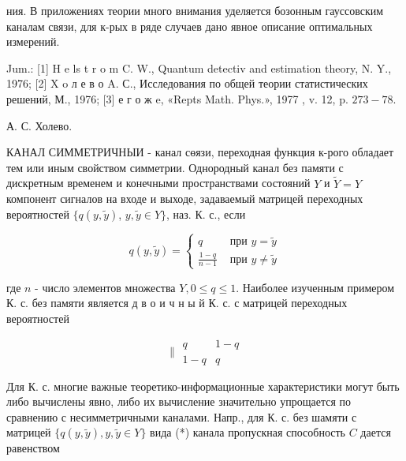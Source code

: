 \documentclass[10pt]{article}
\begin{document}
ния. В приложениях теории много внимания уделяется бозонным гауссовским каналам связи, для к-рых в ряде случаев дано явное описание оптимальных измерений.



Jum.: [1] H e ls t r o m C. W., Quantum detectiv and estimation theory, N. Y., 1976; [2] X o л е в о A. С., Исследования по общей теории статистических решений, М., 1976; [3] е г о ж e, «Repts Math. Phys.», 1977 , v. 12, p. $273-78$.



А. С. Холево.



КАНАЛ СИММЕТРИЧНЫИ - канал сөязи, переходная функция к-рого обладает тем или иным свойством симметрии. Однородный канал без памяти с дискретным временем и конечными пространствами состояний $Y$ и $\tilde{Y}=Y$ компонент сигналов на входе и выходе, задаваемый матрицей переходных вероятностей $\{q(y, \tilde{y})$, $y, \tilde{y} \in Y\}$, наз. К. с., если



\[

q(y, \tilde{y})= \begin{cases}q & \text { при } y=\tilde{y} \\ \frac{1-q}{n-1} & \text { при } y \neq \tilde{y}\end{cases}

\]



где $n$ - число элементов множества $Y, 0 \leqslant q \leqslant 1$. Наиболее изученным примером К. с. без памяти является д в о и ч н ы й К. с. с матрицей переходных вероятностей



\[

\| \begin{array}{cc}

q & 1-q \\

1-q & q

\end{array}

\]



Для К. с. многие важные теоретико-информационные характеристики могут быть либо вычислены явно, либо их вычисление значительно упрощается по сравнению с несимметричными каналами. Напр., для К. с. без шамяти с матрицей $\{q(y, \tilde{y}), y, \tilde{y} \in Y\}$ вида (*) канала пропускная способность $C$ дается равенством
\end{document}
